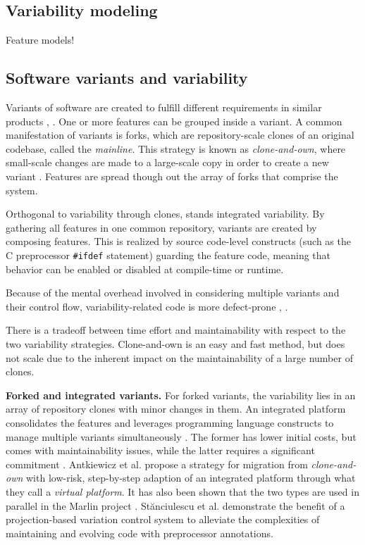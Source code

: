 \subsection{Variability modeling}
Feature models!

\subsection{Software variants and variability}
Variants of software are created to fulfill different requirements in similar products \cite{antkiewicz2014flexible}, \cite{stanciulescu2015}. One or more features can be grouped inside a variant. A common manifestation of variants is forks, which are repository-scale clones of an original codebase, called the \textit{mainline}. This strategy is known as \textit{clone-and-own}, where small-scale changes are made to a large-scale copy in order to create a new variant \cite{stanciulescu2015}. Features are spread though out the array of forks that comprise the system.

Orthogonal to variability through clones, stands integrated variability. By gathering all features in one common repository, variants are created by composing features. This is realized by source code-level constructs (such as the C preprocessor \texttt{\#ifdef} statement) guarding the feature code, meaning that behavior can be enabled or disabled at compile-time or runtime.

Because of the mental overhead involved in considering multiple variants and their control flow, variability-related code is more defect-prone \cite{medeiros2013syntaxerrors}, \cite{melo2016latin}.

There is a tradeoff between time effort and maintainability with respect to the two variability strategies. Clone-and-own is an easy and fast method, but does not scale due to the inherent impact on the maintainability of a large number of clones.

\textbf{Forked and integrated variants.} For forked variants, the variability lies in an array of repository clones with minor changes in them. An integrated platform consolidates the features and leverages programming language constructs to manage multiple variants simultaneously \cite{stanciulescu2015}. The former has lower initial costs, but comes with maintainability issues, while the latter requires a significant commitment \cite{antkiewicz2014flexible}. Antkiewicz et al. \cite{antkiewicz2014flexible} propose a strategy for migration from \textit{clone-and-own} with low-risk, step-by-step adaption of an integrated platform through what they call a \textit{virtual platform}. It has also been shown that the two types are used in parallel in the Marlin project \cite{stanciulescu2015}. St\u{a}nciulescu et al. \cite{stanciulescu2016concepts} demonstrate the benefit of a projection-based variation control system to alleviate the complexities of maintaining and evolving code with preprocessor annotations.

